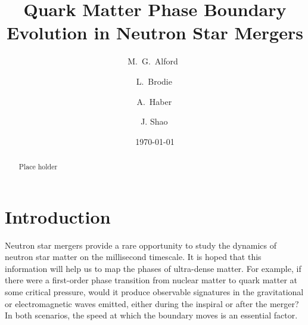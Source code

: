 \documentclass[10pt,superscriptaddress,
amsmath,aps,prc,twocolumn,nofootinbib,floatfix]{revtex4-1}
\begin{document}
\title{Quark Matter Phase Boundary Evolution in Neutron Star Mergers}
 \author{M.~G.~Alford \,}
 \author{L.~Brodie\,}
 \author{A.~Haber\,}
 \author{J. Shao\,}

\date{\today}

\begin{abstract}
Place holder
\end{abstract}

\maketitle

\section{Introduction}

Neutron star mergers provide a rare opportunity to study the dynamics of neutron star matter on the millisecond timescale. It is hoped that this information will help us to map the phases of ultra-dense matter. For example, if there were a first-order phase transition from nuclear matter to quark matter at some critical pressure, would it produce observable signatures in the gravitational or electromagnetic waves emitted, either during the inspiral or after the merger? In both scenarios, the speed at which the boundary moves is an essential factor.
\end{document}
